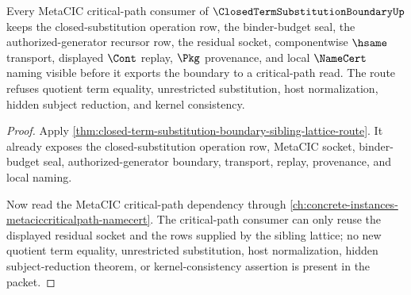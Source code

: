 \begin{theorem}
\label{thm:closed-term-substitution-boundary-metacic-sibling-lattice-route}
Every MetaCIC critical-path consumer of $\ClosedTermSubstitutionBoundaryUp$ keeps the closed-substitution operation row, the binder-budget seal, the authorized-generator recursor row, the residual socket, componentwise $\hsame$ transport, displayed $\Cont$ replay, $\Pkg$ provenance, and local $\NameCert$ naming visible before it exports the boundary to a critical-path read. The route refuses quotient term equality, unrestricted substitution, host normalization, hidden subject reduction, and kernel consistency.
\end{theorem}
\begin{proof}
Apply \autoref{thm:closed-term-substitution-boundary-sibling-lattice-route}. It already exposes the closed-substitution operation row, MetaCIC socket, binder-budget seal, authorized-generator boundary, transport, replay, provenance, and local naming.

Now read the MetaCIC critical-path dependency through \autoref{ch:concrete-instances-metaciccriticalpath-namecert}. The critical-path consumer can only reuse the displayed residual socket and the rows supplied by the sibling lattice; no new quotient term equality, unrestricted substitution, host normalization, hidden subject-reduction theorem, or kernel-consistency assertion is present in the packet.
\end{proof}
